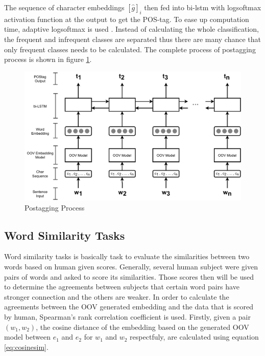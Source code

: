         The sequence of character embeddings $[\hat{g}]_i$ then fed
        into bi-lstm with logsoftmax activation function at the output
        to get the POS-tag. To ease up computation time, adaptive
        logsoftmax is used \cite{grave2018efficientsoftmax}. Instead
        of calculating the whole classification, the frequent and
        infrequent classes are separated thus there are many chance
        that only frequent classes needs to be calculated. The
        complete process of postagging process is shown in figure
        \ref{fig:postag}.

        \begin{figure}
            \centering
            \includegraphics[width=.8\linewidth]{images/postag.pdf}
            \caption{Postagging Process}
            \label{fig:postag}
        \end{figure}
 
    \subsection{Word Similarity Tasks}
        Word similarity tasks is basically task to evaluate the
        similarities between two words based on human given scores.
        Generally, several human subject were given pairs of words and
        asked to score its similarities. Those scores then will be
        used to determine the agreements between subjects that certain
        word pairs have stronger connection and the others are weaker.
        In order to calculate the agreements between the OOV generated
        embedding and the data that is scored by human, Spearman's
        rank correlation coefficient is used. Firstly, given a pair
        $(w_1, w_2)$, the cosine distance of the embedding based on
        the generated OOV model between $e_1$ and $e_2$ for $w_1$ and
        $w_2$ respectfuly, are calculated using equation
        \ref{eq:cosinesim}. 

